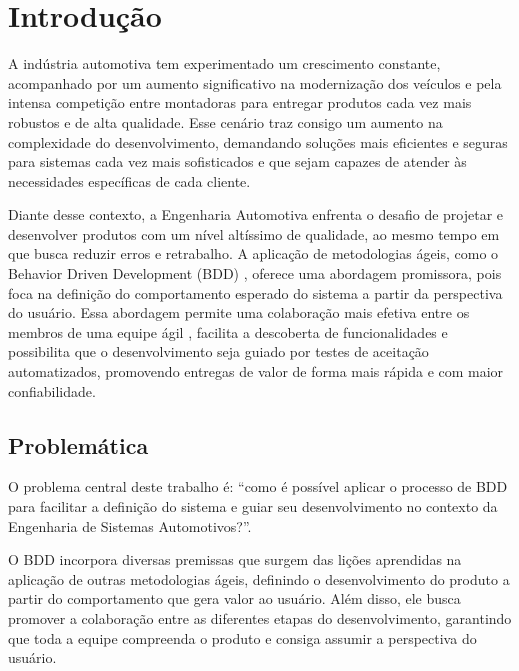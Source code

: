\chapter{Introdução}

A indústria automotiva tem experimentado um crescimento constante, acompanhado por um aumento significativo na modernização dos veículos e pela intensa competição entre 
montadoras para entregar produtos cada vez mais robustos e de alta qualidade. Esse cenário traz consigo um aumento na complexidade do desenvolvimento, demandando soluções 
mais eficientes e seguras para sistemas cada vez mais sofisticados e que sejam capazes de atender às necessidades específicas de cada cliente.

Diante desse contexto, a Engenharia Automotiva enfrenta o desafio de projetar e desenvolver produtos com um nível altíssimo de qualidade, ao mesmo tempo em que busca reduzir 
erros e retrabalho. A aplicação de metodologias ágeis, como o Behavior Driven Development (BDD) \cite{north2006bdd}, oferece uma abordagem promissora, pois foca na definição 
do comportamento esperado do sistema a partir da perspectiva do usuário. Essa abordagem permite uma colaboração mais efetiva entre os membros de uma equipe ágil 
\cite{atlassianAgileTeams}, facilita a descoberta de funcionalidades e possibilita que o desenvolvimento seja guiado por testes de aceitação automatizados, promovendo entregas de valor de forma 
mais rápida e com maior confiabilidade.

\section{Problemática}

O problema central deste trabalho é: “como é possível aplicar o processo de BDD para facilitar a definição do sistema e guiar seu desenvolvimento no contexto da 
Engenharia de Sistemas Automotivos?”.

O BDD incorpora diversas premissas que surgem das lições aprendidas na aplicação de outras metodologias ágeis, definindo o desenvolvimento do produto a partir do 
comportamento que gera valor ao usuário. Além disso, ele busca promover a colaboração entre as diferentes etapas do desenvolvimento, garantindo que toda a equipe 
compreenda o produto e consiga assumir a perspectiva do usuário.

